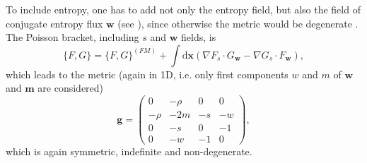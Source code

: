 \documentclass[
10pt, %
a4paper, %
oneside, %
headinclude,footinclude, %
BCOR5mm, %
]{scrartcl}
\newcommand{\xx}{\mathbf{x}}
\newcommand{\diff}{\mathrm{d}}
\newcommand{\mm}{\mathbf{m}}
\newcommand{\ww}{\mathbf{w}}
\newcommand{\Ffunc}{F}
\newcommand{\Gfunc}{G}
\begin{document}
To include entropy, one has to add not only the entropy field, but also the field of conjugate 
entropy flux $\ww$ (see \cite{SHTC-GENERIC}), since otherwise the metric would be degenerate 
\cite{Dubrovin-Novikov}. The Poisson bracket, including $s$ and $\ww$ fields, is
\begin{equation}
    \{\Ffunc,\Gfunc\}=\{\Ffunc,\Gfunc\}^{(FM)} + \int\diff\xx (\nabla \Ffunc_s 
    \cdot \Gfunc_\ww - \nabla \Gfunc_s \cdot \Ffunc_\ww),
\end{equation}
which leads to the metric (again in 1D, i.e. only first components $ w $ and $ m $ of $ \ww $ and $ 
\mm $ are considered)
\begin{equation}
    \mathbf{g} = 
    \begin{pmatrix}
    0 & -\rho & 0 & 0\\ 
    -\rho & -2m & -s & -w\\
    0 & -s & 0 & -1\\
    0 & -w &  -1 & 0
    \end{pmatrix},
\end{equation}
which is again symmetric, indefinite and non-degenerate. 
\end{document}
